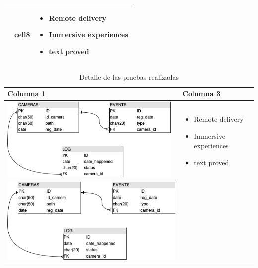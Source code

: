 \begin{table}[H]
\begin{center}
\begin{tabular}{|>{\centering}p{}|>{\centering}m{}|m{}<{\centering}|}
\begin{minipage}{.3\textwidth}
            \end{minipage} & cell8 & \begin{itemize} 
                \item Remote delivery 
                \item Immersive experiences
                \item text proved
            \end{itemize} \\
            \hline
        \end{tabular}
    \end{center}
\end{table}

\begin{table}[H]
    \caption{Detalle de las pruebas realizadas}
    \begin{center}
        \begin{tabular}{|>{\centering}p{}|m{}<{\centering}|} 
            \hline
            \textbf{Columna 1} & \textbf{Columna 3} \\
            \hline
            \begin{minipage}{.3\textwidth}
                \includegraphics[width=\linewidth, height=40mm]{img/capitulo_4/db.png}
            \end{minipage}
            & \begin{itemize} 
                \item Remote delivery 
                \item Immersive experiences
                \item text proved
            \end{itemize} \\ 
            \hline
            \begin{minipage}{0.6\textwidth}
                \includegraphics[width=\linewidth]{img/capitulo_4/db.png}

\end{minipage}
\end{tabular}
\end{center}
\end{table}
